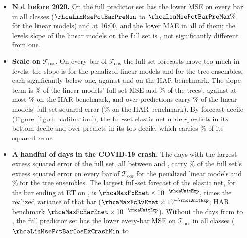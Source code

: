 \begin{itemize}
\begin{itemize}
    on every bar of $\mathcal T_{\mathrm{oos}}$, and the ratio of mean realized to mean forecast variance lies between
    \rhcaAllRmBarOosMin{} and \rhcaAllRmBarOosMax.
  \item \textbf{Not before 2020.} On \rhcaYearsPre{} the full predictor set has the lower MSE on every bar in all
    \rhorAfPairs{} classes ($\rhcaLinMsePctBarPreMin$ to $\rhcaLinMsePctBarPreMax\%$ for the linear models) and at
    16:00, and the lower MAE in all of them; the levels slope of the linear models on the full set is
    \rhcaLinFullMzBBarPreRng, not significantly different from one.
  \item \textbf{Scale on $\mathcal T_{\mathrm{oos}}$.} On every bar of $\mathcal T_{\mathrm{oos}}$ the full-set forecasts move
    too much in levels: the slope is \rhcaLinFullMzBBarOosRng{} for the penalized linear models
    and \rhcaTreeFullMzBBarOosRng{} for the tree ensembles, each significantly below one,
    against \rhcaLinHarMzBBarOos{} and \rhcaTreeHarMzBBarOosRng{} on the HAR benchmark. The
    slope term is \rhcaLinFullShSlopeBarOosRng\% of the linear models' full-set MSE and
    \rhcaTreeFullShSlopeBarOosRng\% of the trees', against at most
    \rhcaAllHarShSlopeBarOosMax\% on the HAR benchmark, and over-predictions carry
    \rhcaLinFullOverSeBarOosRng\% of the linear models' full-set squared error
    (\rhcaAllHarOverSeBarOosRng\% on the HAR benchmark). By forecast decile
    (Figure~\ref{fig:rh_calibration}), the full-set elastic net under-predicts in its bottom decile and over-predicts
    in its top decile, which carries \rhcaTopDecSeEnetFullBarOos\% of its squared error.
  \item \textbf{A handful of days in the COVID-19 crash.} The \rhcaTopDays{} days with the largest excess squared error
    of the full set, all between \rhcaTopFirstBarOos{} and \rhcaTopLastBarOos, carry
    \rhcaLinTopShareBarOosRng\% of the full set's excess squared error on every bar of
    $\mathcal T_{\mathrm{oos}}$ for the penalized linear models and
    \rhcaTreeTopShareBarOosRng\% for the tree ensembles. The largest full-set forecast of the
    elastic net, for the bar ending at \rhcaMaxFcClock{} ET on \rhcaMaxFcDate, is
    $\rhcaMaxFcEnet \times 10^{-\rhcaUnitExp}$, \rhcaMaxFcRatioEnet{} times the realized variance of that bar
    ($\rhcaMaxFcRvEnet \times 10^{-\rhcaUnitExp}$; HAR benchmark $\rhcaMaxFcHarEnet \times 10^{-\rhcaUnitExp}$). Without
    the days from \rhcaCrashStart{} to \rhcaCrashEnd, the full predictor set has the lower every-bar MSE on
    $\mathcal T_{\mathrm{oos}}$ in all \rhorAfPairs{} classes ($\rhcaLinMsePctBarOosExCrashMin$ to

\end{itemize}
\end{itemize}
